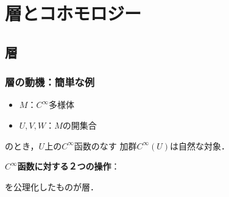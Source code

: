 \documentclass[dvipdfmx,10pt,aspectratio=169,leqno]{beamer}%
\numberwithin{equation}{subsection}
\theoremstyle{mystyle}
\begin{document}
\section[層]{層とコホモロジー}
\subsection{層}
\begin{frame}
  \frametitle{層の動機：簡単な例}

  \begin{itemize}
    \item \(M\)：\(C^{\infty}\)多様体
    \item \(U, V, W\)：\(M\)の開集合
  \end{itemize}
  のとき，\(U\)上の\(C^{\infty}\)函数のなす
  加群\(C^{\infty}(U)\)は自然な対象．\pause
  
  \textbf{\(C^{\infty}\)函数に対する２つの操作}：
  \begin{description}
    \item[]
    \item[] 
  \end{description}

  を公理化したものが層．
\end{frame}
\end{document}
